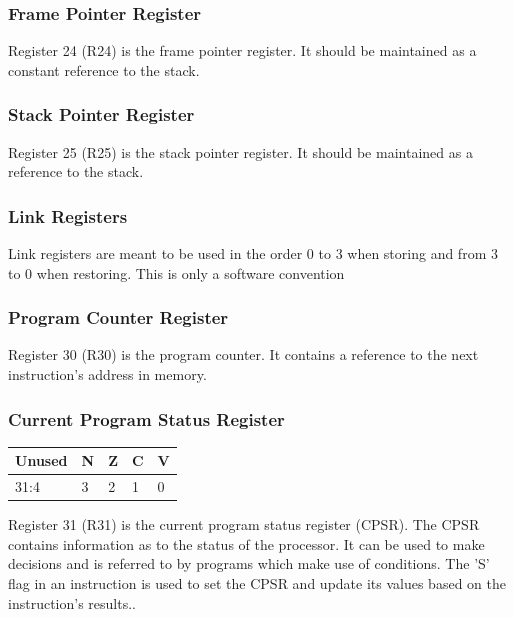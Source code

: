 \documentclass[12pt]{article}
\begin{document}
    \subsubsection{Frame Pointer Register}
        Register 24 (R24) is the frame pointer register. It should be maintained as a constant reference to the stack.
        
    \subsubsection{Stack Pointer Register}
        Register 25 (R25) is the stack pointer register. It should be maintained as a reference to the stack.
        
    \subsubsection{Link Registers}
        Link registers are meant to be used in the order 0 to 3 when storing and from 3 to 0 when restoring. This is only a software convention
        
    \subsubsection{Program Counter Register}
        Register 30 (R30) is the program counter. It contains a reference to the next instruction's address in memory.
        
    \subsubsection{Current Program Status Register}
        \begin{center}
        \begin{tabular}{
        |p{10.6cm}|p{0.3cm}|p{0.3cm}|p{0.3cm}|p{0.3cm}|}
            \hline
            \textbf{Unused} & \textbf{N} & \textbf{Z} & \textbf{C} & \textbf{V}\\
            \hline
            31:4 & 3 & 2 & 1 & 0\\
            \hline
        \end{tabular}
        \end{center}
        \vspace{.5em}
        Register 31 (R31) is the current program status register (CPSR). The CPSR contains information as to the status of the processor. It can be used to make decisions and is referred to by programs which make use of conditions. The 'S' flag in an instruction is used to set the CPSR and update its values based on the instruction's results..
    
\end{document}
